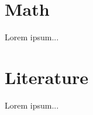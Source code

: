 \documentclass[../main.tex]{subfiles}
\begin{document}
\appendix

\section{Math}\label{appendix:math}

Lorem ipsum...

\clearpage
\section{Literature}

Lorem ipsum...
\end{document}
